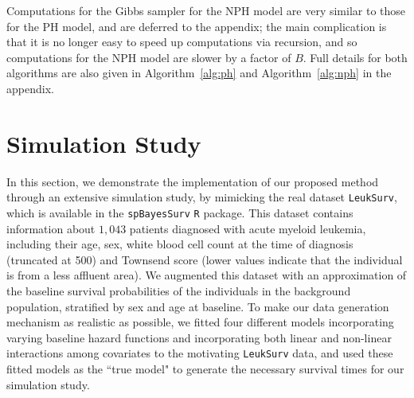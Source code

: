 \documentclass[12pt]{article}
\begin{document}
Computations for the Gibbs sampler for the NPH model are very similar to those 
for the PH model, and are deferred to the appendix; the main complication is that it is no longer easy to speed up computations via recursion, and so computations for the NPH model are slower by a factor of $B$. Full details for both algorithms are also given in Algorithm~\ref{alg:ph} and Algorithm~\ref{alg:nph} in the appendix.

\section{Simulation Study}\label{sec:simulation}


In this section, we demonstrate the implementation of our proposed method through an extensive simulation study, by mimicking the real dataset \texttt{LeukSurv}, which is available in the \texttt{spBayesSurv} \texttt{R} package. This dataset contains information about $1,043$ patients diagnosed with acute myeloid leukemia, including their age, sex, white blood cell count at the time of diagnosis (truncated at 500) and Townsend score (lower values indicate that the individual is from a less affluent area). We augmented this dataset with an approximation of the baseline survival probabilities of the individuals in the background population, stratified by sex and age at baseline. To make our data generation mechanism as realistic as possible, we fitted four different models incorporating varying baseline hazard functions and incorporating both linear and non-linear  interactions among covariates to the motivating \texttt{LeukSurv} data, and used these fitted models as the ``true model" to generate the necessary survival times for our simulation study.
\end{document}
